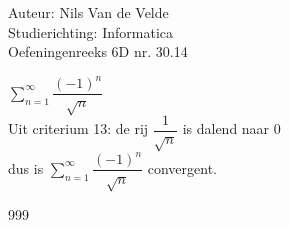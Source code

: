 \documentclass[a4paper]{article}
\newcommand{\lsum}{\displaystyle\sum\limits}
\begin{document}
  
\noindent \large Auteur: Nils Van de Velde \\
\noindent \large Studierichting: Informatica\\
\noindent \large Oefeningenreeks 6D nr. 30.14\\

\medskip

\normalsize

$\lsum_{n=1}^{\infty} \dfrac{(-1)^n}{\sqrt{n}}$\\

Uit criterium 13: de rij $\dfrac{1}{\sqrt{n}}$ is dalend naar 0\\

dus is $\lsum_{n=1}^{\infty} \dfrac{(-1)^n}{\sqrt{n}}$ convergent.
\begin{thebibliography}{999}
\end{thebibliography}
\end{document}

